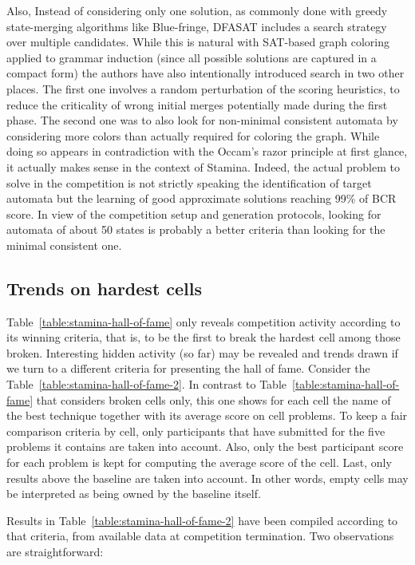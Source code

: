 Also, Instead of considering only one solution, as commonly done with greedy state-merging algorithms like Blue-fringe, DFASAT includes a search strategy over multiple candidates. While this is natural with SAT-based graph coloring applied to grammar induction (since all possible solutions are captured in a compact form) the authors have also intentionally introduced search in two other places. The first one involves a random perturbation of the scoring heuristics, to reduce the criticality of wrong initial merges potentially made during the first phase. The second one was to also look for non-minimal consistent automata by considering more colors than actually required for coloring the graph. While doing so appears in contradiction with the Occam's razor principle at first glance, it actually makes sense in the context of Stamina. Indeed, the actual problem to solve in the competition is not strictly speaking the identification of target automata but the learning of good approximate solutions reaching 99\% of BCR score. In view of the competition setup and generation protocols, looking for automata of about 50 states is probably a better criteria than looking for the minimal consistent one.

\subsection{Trends on hardest cells\label{subsection:stamina-trends-on-hardest-cells}}

Table~\ref{table:stamina-hall-of-fame} only reveals competition activity according to its winning criteria, that is, to be the first to break the hardest cell among those broken. Interesting hidden activity (so far) may be revealed and trends drawn if we turn to a different criteria for presenting the hall of fame. Consider the Table~\ref{table:stamina-hall-of-fame-2}. In contrast to Table~\ref{table:stamina-hall-of-fame} that considers broken cells only, this one shows for each cell the name of the best technique together with its average score on cell problems. To keep a fair comparison criteria by cell, only participants that have submitted for the five problems it contains are taken into account. Also, only the best participant score for each problem is kept for computing the average score of the cell. Last, only results above the baseline are taken into account. In other words, empty cells may be interpreted as being owned by the baseline itself. 

Results in Table~\ref{table:stamina-hall-of-fame-2} have been compiled according to that criteria, from available data at competition termination. Two observations are straightforward: 

